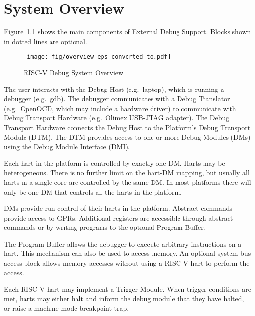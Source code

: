 \chapter{System Overview} \label{overview}

Figure~\ref{fig:overview} shows the main components of External Debug Support.
Blocks shown in dotted lines are optional. 

\begin{figure}
   \centering
   \texttt{[image: fig/overview-eps-converted-to.pdf]}
   \caption{RISC-V Debug System Overview}
   \label{fig:overview}
\end{figure}

The user interacts with the Debug Host (e.g.\ laptop), which is running a
debugger (e.g.\ gdb).  The debugger communicates with a Debug Translator (e.g.\ 
OpenOCD, which may include a hardware driver) to communicate with Debug
Transport Hardware (e.g.\ Olimex USB-JTAG adapter).
The Debug Transport Hardware connects the Debug Host to the Platform's Debug
Transport Module (DTM).  The DTM provides access to one or more Debug Modules
(DMs) using the Debug Module Interface (DMI).

Each hart in the platform is controlled by exactly one DM. Harts may be
heterogeneous. There is no further limit on the hart-DM mapping, but usually
all harts in a single core are controlled by the same DM. In most platforms there
will only be one DM that controls all the harts in the platform.

DMs provide run control of their harts in the platform. Abstract commands
provide access to GPRs. Additional registers are accessible through abstract
commands or by writing programs to the optional Program Buffer.

The Program Buffer allows the debugger to execute arbitrary instructions on a
hart. This mechanism can also be used to access memory.  An optional system bus
access block allows memory accesses without using a RISC-V hart to perform the
access.

Each RISC-V hart may implement a Trigger Module. When trigger conditions
are met, harts may either halt and inform the debug module that they have
halted, or raise a machine mode breakpoint trap.
